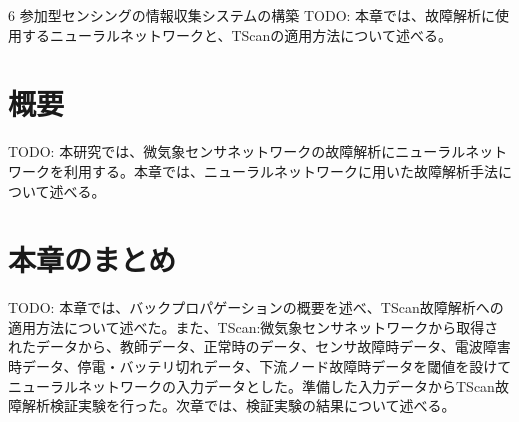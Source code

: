 \chapterhead
{6}
{参加型センシングの情報収集システムの構築}
{TODO: 本章では、故障解析に使用するニューラルネットワークと、TScanの適用方法について述べる。}

\newpage
\section{概要}
TODO: 本研究では、微気象センサネットワークの故障解析にニューラルネットワークを利用する。本章では、ニューラルネットワークに用いた故障解析手法について述べる。

\newpage

\section{本章のまとめ}
TODO: 本章では、バックプロパゲーションの概要を述べ、TScan故障解析への適用方法について述べた。また、TScan:微気象センサネットワークから取得されたデータから、教師データ、正常時のデータ、センサ故障時データ、電波障害時データ、停電・バッテリ切れデータ、下流ノード故障時データを閾値を設けてニューラルネットワークの入力データとした。準備した入力データからTScan故障解析検証実験を行った。次章では、検証実験の結果について述べる。
\newpage
